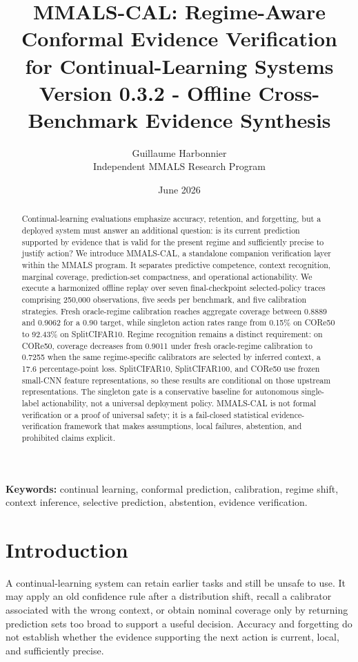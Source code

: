 \documentclass[10pt]{article}
\title{\bfseries MMALS-CAL: Regime-Aware Conformal Evidence Verification for Continual-Learning Systems\\\large Version 0.3.2 - Offline Cross-Benchmark Evidence Synthesis}
\author{Guillaume Harbonnier\\Independent MMALS Research Program}
\date{June 2026}
\newcommand{\mmalscal}{\textsc{MMALS-CAL}}
\begin{document}
\maketitle

\begin{abstract}
Continual-learning evaluations emphasize accuracy, retention, and forgetting, but a deployed system must answer an additional question: is its current prediction supported by evidence that is valid for the present regime and sufficiently precise to justify action? We introduce \mmalscal{}, a standalone companion verification layer within the MMALS program. It separates predictive competence, context recognition, marginal coverage, prediction-set compactness, and operational actionability. We execute a harmonized offline replay over seven final-checkpoint selected-policy traces comprising 250,000 observations, five seeds per benchmark, and five calibration strategies. Fresh oracle-regime calibration reaches aggregate coverage between 0.8889 and 0.9062 for a 0.90 target, while singleton action rates range from 0.15\% on CORe50 to 92.43\% on SplitCIFAR10. Regime recognition remains a distinct requirement: on CORe50, coverage decreases from 0.9011 under fresh oracle-regime calibration to 0.7255 when the same regime-specific calibrators are selected by inferred context, a 17.6 percentage-point loss. SplitCIFAR10, SplitCIFAR100, and CORe50 use frozen small-CNN feature representations, so these results are conditional on those upstream representations. The singleton gate is a conservative baseline for autonomous single-label actionability, not a universal deployment policy. \mmalscal{} is not formal verification or a proof of universal safety; it is a fail-closed statistical evidence-verification framework that makes assumptions, local failures, abstention, and prohibited claims explicit.
\end{abstract}

\noindent\textbf{Keywords:} continual learning, conformal prediction, calibration, regime shift, context inference, selective prediction, abstention, evidence verification.

\section{Introduction}
A continual-learning system can retain earlier tasks and still be unsafe to use. It may apply an old confidence rule after a distribution shift, recall a calibrator associated with the wrong context, or obtain nominal coverage only by returning prediction sets too broad to support a useful decision. Accuracy and forgetting do not establish whether the evidence supporting the next action is current, local, and sufficiently precise.
\end{document}
